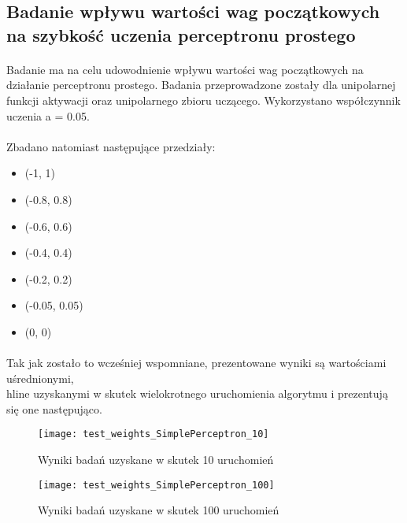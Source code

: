\documentclass[\main/main.tex]{subfiles}
\begin{document}
    \justify
    \subsection{Badanie wpływu wartości wag początkowych na szybkość uczenia perceptronu prostego}
    \paragraph{}
    Badanie ma na celu udowodnienie wpływu wartości wag początkowych na działanie perceptronu prostego. Badania przeprowadzone zostały dla unipolarnej funkcji aktywacji oraz unipolarnego zbioru uczącego. Wykorzystano współczynnik uczenia a = 0.05.
    
    \paragraph{}
    Zbadano natomiast następujące przedziały:
    \begin{itemize}
     \item (-1, 1)
     \item (-0.8,  0.8)
     \item (-0.6, 0.6)
     \item (-0.4, 0.4)
     \item (-0.2, 0.2)
     \item (-0.05, 0.05)
     \item (0, 0)
    \end{itemize}
    
    \paragraph{}
    Tak jak zostało to wcześniej wspomniane, prezentowane wyniki są wartościami uśrednionymi, \\hline
    uzyskanymi w skutek wielokrotnego uruchomienia algorytmu i prezentują się one następująco.

    \begin{figure}[H]
    \centering
    \texttt{[image: test\_weights\_SimplePerceptron\_10]}
    \caption{Wyniki badań uzyskane w skutek 10 uruchomień}
    \end{figure}

    \begin{figure}[H]
    \centering
    \texttt{[image: test\_weights\_SimplePerceptron\_100]}
    \caption{Wyniki badań uzyskane w skutek 100 uruchomień}
    \end{figure}
    
\end{document}
